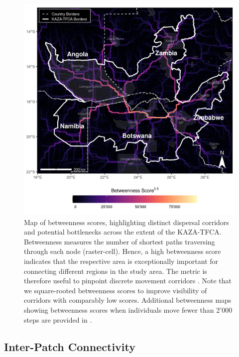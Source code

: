 \documentclass[../FinalThesis.tex]{subfiles}
\begin{document}
\begin{figure}[htpb]
  \includegraphics[width=\textwidth]{Figures/Betweenness.png}
  \caption{Map of betweenness scores, highlighting distinct dispersal corridors
  and potential bottlenecks across the extent of the KAZA-TFCA. Betweenness
  measures the number of shortest paths traversing through each node
  (raster-cell). Hence, a high betweenness score indicates that the respective
  area is exceptionally important for connecting different regions in the study
  area. The metric is therefore useful to pinpoint discrete movement corridors
  \citep{Bastille-Rousseau.2018}. Note that we square-rooted betweenness scores
  to improve visibility of corridors with comparably low scores. Additional
  betweenness maps showing betweenness scores when individuals move fewer than
  2'000 steps are provided in .}
  \label{Betweenness}
\end{figure}

\subsection{Inter-Patch Connectivity}
\end{document}
